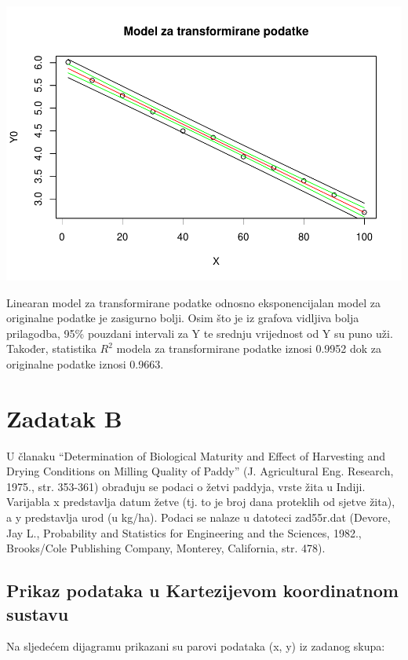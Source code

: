 \documentclass[]{article}
\begin{document}
\includegraphics{Izvjestaj_files/figure-latex/unnamed-chunk-15-2.pdf}

Linearan model za transformirane podatke odnosno eksponencijalan model
za originalne podatke je zasigurno bolji. Osim što je iz grafova
vidljiva bolja prilagodba, 95\% pouzdani intervali za Y te srednju
vrijednost od Y su puno uži. Također, statistika \(R^2\) modela za
transformirane podatke iznosi 0.9952 dok za originalne podatke iznosi
0.9663.

\section{Zadatak B}\label{zadatak-b}

U članaku ``Determination of Biological Maturity and Effect of
Harvesting and Drying Conditions on Milling Quality of Paddy'' (J.
Agricultural Eng. Research, 1975., str. 353-361) obrađuju se podaci o
žetvi paddyja, vrste žita u Indiji. Varijabla x predstavlja datum žetve
(tj. to je broj dana proteklih od sjetve žita), a y predstavlja urod (u
kg/ha). Podaci se nalaze u datoteci zad55r.dat (Devore, Jay L.,
Probability and Statistics for Engineering and the Sciences, 1982.,
Brooks/Cole Publishing Company, Monterey, California, str. 478).

\subsection{Prikaz podataka u Kartezijevom koordinatnom
sustavu}\label{prikaz-podataka-u-kartezijevom-koordinatnom-sustavu-1}

Na sljedećem dijagramu prikazani su parovi podataka (x, y) iz zadanog
skupa:
\end{document}
